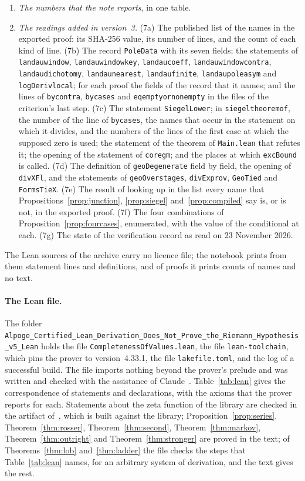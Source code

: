\documentclass[11pt]{article}
\theoremstyle{definition}
\theoremstyle{remark}
\DeclareRobustCommand{\lean}[1]{{\renewcommand{\_}{\textunderscore\allowbreak}\texttt{#1}}}
\begin{document}
\begin{enumerate}[leftmargin=2em,itemsep=1pt]
\item \emph{The numbers that the note reports}, in one table.
\item \emph{The readings added in version~3.} (7a) The published list of the names in the exported proof: its SHA-256 value, its number of lines, and the count of each kind of line. (7b) The record \lean{PoleData} with its seven fields; the statements of \lean{landau\_window}, \lean{landau\_window\_key}, \lean{landau\_coeff}, \lean{landau\_window\_contra}, \lean{landau\_dichotomy}, \lean{landau\_nearest}, \lean{landau\_finite}, \lean{landau\_pole\_asym} and \lean{logDeriv\_local}; for each proof the fields of the record that it names; and the lines of \lean{by\_contra}, \lean{by\_cases} and \lean{eq\_empty\_or\_nonempty} in the files of the criterion's last step. (7c) The statement \lean{SiegelLower}; in \lean{siegel\_theorem\_of}, the number of the line of \lean{by\_cases}, the names that occur in the statement on which it divides, and the numbers of the lines of the first case at which the supposed zero is used; the statement of the theorem of \lean{Main.lean} that refutes it; the opening of the statement of \lean{core\_gm}; and the places at which \lean{excBound} is called. (7d) The definition of \lean{geoDegenerate} field by field, the opening of \lean{divXFl}, and the statements of \lean{geoOver\_stages}, \lean{divEx\_prov}, \lean{GeoTied} and \lean{FormsTieX}. (7e) The result of looking up in the list every name that Propositions~\ref{prop:junction}, \ref{prop:siegel} and~\ref{prop:compiled} say is, or is not, in the exported proof. (7f) The four combinations of Proposition~\ref{prop:fourcases}, enumerated, with the value of the conditional at each. (7g) The state of the verification record as read on 23 November 2026.
\end{enumerate}
The Lean sources of the archive carry no licence file; the notebook prints from them statement lines and definitions, and of proofs it prints counts of names and no text.

\paragraph{The Lean file.} The folder \nolinkurl{Alpoge_Certified_Lean_Derivation_Does_Not_Prove_the_Riemann_Hypothesis_v5_Lean} holds the file \nolinkurl{CompletenessOfValues.lean}, the file \nolinkurl{lean-toolchain}, which pins the prover to version~4.33.1, the file \nolinkurl{lakefile.toml}, and the log of a successful build. The file imports nothing beyond the prover's prelude and was written and checked with the assistance of Claude~\citep{claude}. Table~\ref{tab:lean} gives the correspondence of statements and declarations, with the axioms that the prover reports for each. Statements about the zeta function of the library are checked in the artifact of~\citet{tv}, which is built against the library; Proposition~\ref{prop:series}, Theorem~\ref{thm:rosser}, Theorem~\ref{thm:second}, Theorem~\ref{thm:markov}, Theorem~\ref{thm:outright} and Theorem~\ref{thm:stronger} are proved in the text; of Theorems~\ref{thm:lob} and~\ref{thm:ladder} the file checks the steps that Table~\ref{tab:lean} names, for an arbitrary system of derivation, and the text gives the rest.
\end{document}
